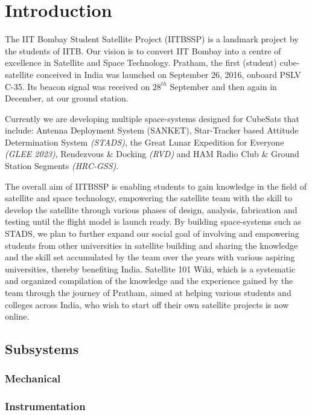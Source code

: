 \documentclass[../../main.tex]{subfiles}
\begin{document}
\chapter{Introduction}
\thispagestyle{fancy}
The IIT Bombay Student Satellite Project (IITBSSP) is a landmark project by the students of IITB. Our vision is to convert IIT Bombay into a centre of excellence in Satellite and Space Technology. Pratham, the first (student) cube-satellite conceived in India was launched on September 26, 2016, onboard PSLV C-35. Its beacon signal was received on $28^{th}$ September and then again in December, at our ground station.

Currently we are developing multiple space-systems designed for CubeSats that include: Antenna Deployment System (SANKET), Star-Tracker based Attitude Determination System \emph{(STADS)}, the Great Lunar Expedition for Everyone \emph{(GLEE 2023)}, Rendezvous \& Docking \emph{(RVD)} and HAM Radio Club \& Ground Station Segments \emph{(HRC-GSS)}.

The overall aim of IITBSSP is enabling students to gain knowledge in the field of satellite and space technology, empowering the satellite team with the skill to develop the satellite through various phases of design, analysis, fabrication and testing until the flight model is launch ready. By building space-systems such as STADS, we plan to further expand our social goal of involving and empowering students from other universities in satellite building and sharing the knowledge and the skill set accumulated by the team over the years with various aspiring universities, thereby benefiting India. Satellite 101 Wiki, which is a systematic and organized compilation of the knowledge and the experience gained by the team through the journey of Pratham, aimed at helping various students and colleges across India, who wish to start off their own satellite projects is now online.


\section{Subsystems}

    \subsection{Mechanical}
    
    
    \subsection{Instrumentation}
    
\end{document}
